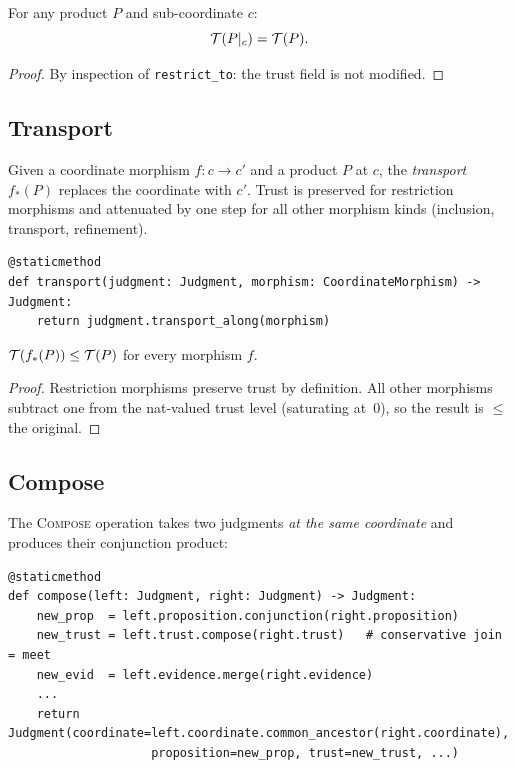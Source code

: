 \documentclass[11pt]{article}
\begin{document}
\begin{lemma}\label{lem:restrict-trust}
For any product $P$ and sub-coordinate $c$:
\[
  \mathcal{T}(P|_c) = \mathcal{T}(P).
\]
\end{lemma}
\begin{proof}
By inspection of \texttt{restrict\_to}: the trust field is not modified.
\end{proof}

\subsection{Transport}

\begin{definition}\label{def:transport}
Given a coordinate morphism $f : c \to c'$ and a product $P$ at $c$,
the \emph{transport} $f_*(P)$ replaces the coordinate with $c'$.
Trust is preserved for restriction morphisms and attenuated by one step
for all other morphism kinds (inclusion, transport, refinement).
\end{definition}

\begin{lstlisting}[style=jugeo-python, caption={JudgmentAlgebra.transport.},
  label=lst:transport]
@staticmethod
def transport(judgment: Judgment, morphism: CoordinateMorphism) -> Judgment:
    return judgment.transport_along(morphism)
\end{lstlisting}

\begin{lemma}\label{lem:transport-mono}
$\mathcal{T}(f_*(P)) \leq \mathcal{T}(P)$ for every morphism $f$.
\end{lemma}
\begin{proof}
Restriction morphisms preserve trust by definition.  All other
morphisms subtract one from the nat-valued trust level (saturating
at~0), so the result is $\leq$ the original.
\end{proof}

\subsection{Compose}

The \textsc{Compose} operation takes two judgments \emph{at the same
coordinate} and produces their conjunction product:

\begin{lstlisting}[style=jugeo-python, caption={JudgmentAlgebra.compose.},
  label=lst:compose]
@staticmethod
def compose(left: Judgment, right: Judgment) -> Judgment:
    new_prop  = left.proposition.conjunction(right.proposition)
    new_trust = left.trust.compose(right.trust)   # conservative join = meet
    new_evid  = left.evidence.merge(right.evidence)
    ...
    return Judgment(coordinate=left.coordinate.common_ancestor(right.coordinate),
                    proposition=new_prop, trust=new_trust, ...)
\end{lstlisting}
\end{document}
